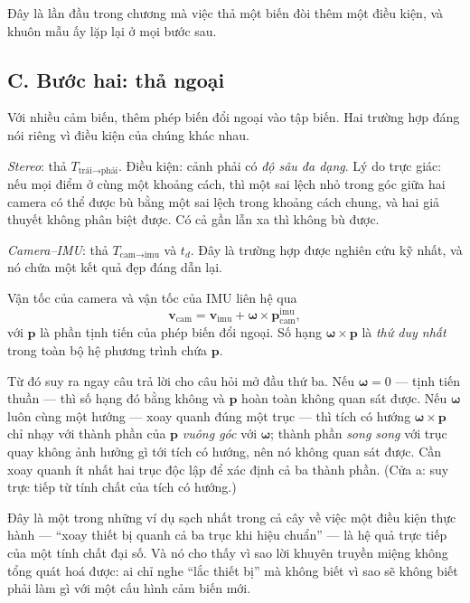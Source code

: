 \documentclass[../../vslam.tex]{subfiles}
\begin{document}
Đây là lần đầu trong chương mà việc thả một biến đòi thêm một điều kiện, và khuôn mẫu ấy lặp lại ở mọi bước sau.

\subsection{C. Bước hai: thả ngoại}

Với nhiều cảm biến, thêm phép biến đổi ngoại vào tập biến. Hai trường hợp đáng nói riêng vì điều kiện của chúng khác nhau.

\emph{Stereo}: thả \(T_{\text{trái}\rightarrow\text{phải}}\). Điều kiện: cảnh phải có \emph{độ sâu đa dạng}. Lý do trực giác: nếu mọi điểm ở cùng một khoảng cách, thì một sai lệch nhỏ trong góc giữa hai camera có thể được bù bằng một sai lệch trong khoảng cách chung, và hai giả thuyết không phân biệt được. Có cả gần lẫn xa thì không bù được.

\emph{Camera--IMU}: thả \(T_{\text{cam}\rightarrow\text{imu}}\) và \(t_d\). Đây là trường hợp được nghiên cứu kỹ nhất, và nó chứa một kết quả đẹp đáng dẫn lại.

Vận tốc của camera và vận tốc của IMU liên hệ qua
\[
\mathbf{v}_{\text{cam}} = \mathbf{v}_{\text{imu}} + \boldsymbol{\omega} \times \mathbf{p}_{\text{cam}}^{\text{imu}},
\]
với \(\mathbf{p}\) là phần tịnh tiến của phép biến đổi ngoại. Số hạng \(\boldsymbol{\omega}\times\mathbf{p}\) là \emph{thứ duy nhất} trong toàn bộ hệ phương trình chứa \(\mathbf{p}\).

Từ đó suy ra ngay câu trả lời cho câu hỏi mở đầu thứ ba. Nếu \(\boldsymbol{\omega} = 0\) --- tịnh tiến thuần --- thì số hạng đó bằng không và \(\mathbf{p}\) hoàn toàn không quan sát được. Nếu \(\boldsymbol{\omega}\) luôn cùng một hướng --- xoay quanh đúng một trục --- thì tích có hướng \(\boldsymbol{\omega}\times\mathbf{p}\) chỉ nhạy với thành phần của \(\mathbf{p}\) \emph{vuông góc} với \(\boldsymbol{\omega}\); thành phần \emph{song song} với trục quay không ảnh hưởng gì tới tích có hướng, nên nó không quan sát được. Cần xoay quanh ít nhất hai trục độc lập để xác định cả ba thành phần. (Cửa a: suy trực tiếp từ tính chất của tích có hướng.)

Đây là một trong những ví dụ sạch nhất trong cả cây về việc một điều kiện thực hành --- ``xoay thiết bị quanh cả ba trục khi hiệu chuẩn'' --- là hệ quả trực tiếp của một tính chất đại số. Và nó cho thấy vì sao lời khuyên truyền miệng không tổng quát hoá được: ai chỉ nghe ``lắc thiết bị'' mà không biết vì sao sẽ không biết phải làm gì với một cấu hình cảm biến mới.
\end{document}
